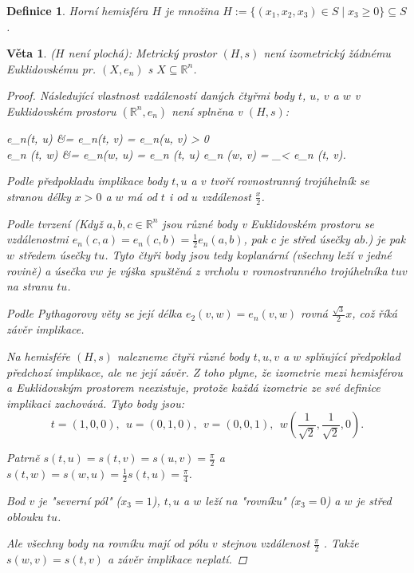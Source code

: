 \documentclass[10pt,a4paper]{article}
\newcommand{\R}{{\mathbb{R}}}       %
\newtheorem*{thm}{Věta}
\newtheorem{Def}{Definice}[section]
\begin{document}
\begin{Def}
	Horní hemisféra \normalfont $ H $ je množina $ H := \{(x_1 , x_2, x_3 ) \in S \mid x_3 \geq 0\} \subseteq S $.
\end{Def}

\begin{thm} ($ H $ není plochá):
	Metrický prostor $ (H, s) $ není izometrický žádnému Euklidovskému pr. $(X, e_n)$ s $ X \subseteq \R^n $.\normalfont
	\begin{proof}
		Následující vlastnost vzdáleností daných čtyřmi body $t$, $ u $, $ v $ a $ w $ v Euklidovském prostoru $(\R^n , e_n )$ není splněna v $ (H, s) $:
		\begin{flalign*}
			e_n(t, u) &= e_n(t, v) = e_n(u, v) > 0 ~~\land \\e_n (t, w) &= e_n(w, u) =  e_n (t, u) \implies e_n (w, v) = _{< e_n (t, v)}.
		\end{flalign*}
		Podle předpokladu implikace body $ t, u $ a $ v $ tvoří rovnostranný trojúhelník se stranou délky $ x > 0 $ a $ w $ má od $ t $ i od $ u $ vzdálenost $ \frac x2 $.
		
		Podle tvrzení \textit{(Když $ a, b, c \in \R^n $ jsou různé body v Euklidovském prostoru se vzdálenostmi $e_n (c, a) = e_n (c, b) = \frac 12 e_n(a, b)$, pak $ c $ je střed úsečky $ ab $.)} je pak $ w $ středem úsečky $ tu $.
		Tyto čtyři body jsou tedy \textit{koplanární} (všechny leží v jedné rovině) a úsečka $ vw $ je výška spuštěná z vrcholu $ v $ rovnostranného trojúhelníka $ tuv $ na stranu $ tu $. 
		
		Podle Pythagorovy věty se její délka $e_2(v, w) = e_n (v, w)$ rovná $ \frac{\sqrt 3}2 x$, což říká závěr implikace.
		
		
		Na hemisféře $ (H, s) $ nalezneme čtyři různé body $ t, u, v $ a $ w $ splňující předpoklad předchozí implikace, ale ne její závěr. 
		Z toho plyne, že izometrie mezi hemisférou a Euklidovským prostorem neexistuje, protože každá izometrie ze své definice implikaci zachovává.
		Tyto body jsou: \[
		t = (1, 0, 0), ~~u = (0, 1, 0), ~~v = (0, 0, 1), ~~w\left(\frac{1}{\sqrt 2}, \frac{1}{\sqrt 2}, 0\right).
		\]
		
		Patrně $ s(t, u) = s(t, v) = s(u, v) = \frac{\pi}2 $ a $ s(t, w) = s(w, u) = \frac 12 s(t, u) = \frac{\pi}4$. 
		
		Bod $ v $ je \textit{"severní pól"} ($x_3 = 1$), $ t, u $ a $ w $ leží na \textit{"rovníku"} ($ x_3 = 0 $) a $ w $ je střed oblouku $ tu $. 

		Ale všechny body na rovníku mají od pólu $ v $ stejnou vzdálenost $ \frac{\pi}2 $ . 
		Takže $ s(w, v) = s(t, v) $ a závěr implikace neplatí.
	\end{proof}
\end{thm}
\end{document}
